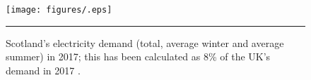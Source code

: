 \begin{figure}[htbp]
	\centering
	\texttt{[image: figures/.eps]}
	\rule{\textwidth}{0.5pt} %
	\caption{Scotland's electricity demand (total, average winter and average summer) in 2017; this has been calculated as 8\% of the UK's demand in 2017 \citep{GridWatchnd}.}
	\label{fig:winter_demand}
\end{figure}